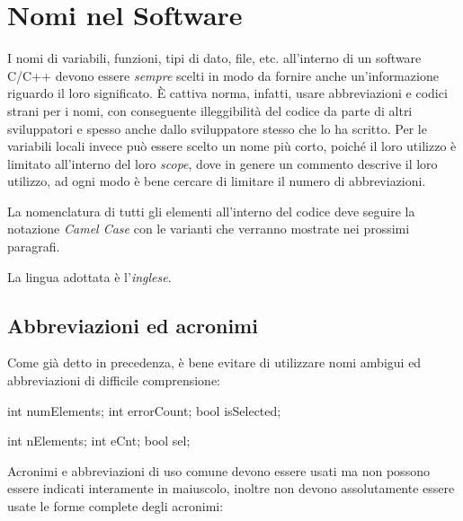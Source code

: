%

\section{Nomi nel Software}\label{sec:name}

I nomi di variabili, funzioni, tipi di dato, file, etc. all'interno di un software C/C++ devono essere \emph{sempre} scelti in modo da fornire anche un'informazione riguardo il loro significato.
È cattiva norma, infatti, usare abbreviazioni e codici strani per i nomi, con conseguente illeggibilità del codice da parte di altri sviluppatori e spesso anche dallo sviluppatore stesso che lo ha scritto.
Per le variabili locali invece può essere scelto un nome più corto, poiché il loro utilizzo è limitato all'interno del loro \emph{scope}, dove in genere un commento descrive il loro utilizzo, ad ogni modo è bene cercare di limitare il numero di abbreviazioni. 

La nomenclatura di tutti gli elementi all'interno del codice deve seguire la notazione \emph{Camel Case}\cite{codestyle:camel} con le varianti che verranno mostrate nei prossimi paragrafi.

La lingua adottata è l'\emph{inglese}.

\subsection{Abbreviazioni ed acronimi}\label{ssec:abbreviations}

Come già detto in precedenza, è bene evitare di utilizzare nomi ambigui ed abbreviazioni di difficile comprensione:

\begin{minipage}[t]{\cbwidth}
\begin{RightCode}
int numElements;
int errorCount;
bool isSelected;
\end{RightCode}
\end{minipage}%
\hspace{\cbdistance}
\begin{minipage}[t]{\cbwidth}
\begin{ErrorCode}
int nElements;
int eCnt;
bool sel;
\end{ErrorCode}
\end{minipage}

Acronimi e abbreviazioni di uso comune devono essere usati ma non possono essere indicati interamente in maiuscolo, inoltre non devono assolutamente essere usate le forme complete degli acronimi:

